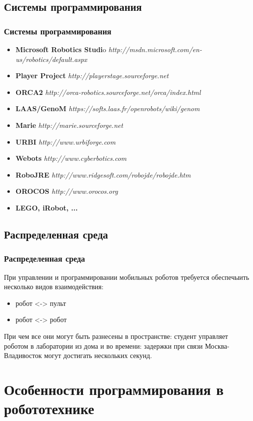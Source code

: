 \documentclass{beamer}
\begin{document}
\subsection{Системы программирования}
\begin{frame}
\frametitle{Системы программирования}
\begin{itemize}
\item<1> \textbf{Microsoft Robotics Studi}o \textit{http://msdn.microsoft.com/en-us/robotics/default.aspx}
\item<1> \textbf{Player Project} \textit{http://playerstage.sourceforge.net}
\item<1> \textbf{ORCA2} \textit{http://orca-robotics.sourceforge.net/orca/index.html}
\item<1> \textbf{LAAS/GenoM} \textit{https://softs.laas.fr/openrobots/wiki/genom}
\item<1> \textbf{Marie} \textit{http://marie.sourceforge.net}
\item<1> \textbf{URBI} \textit{http://www.urbiforge.com}
\item<1> \textbf{Webots} \textit{http://www.cyberbotics.com}
\item<1> \textbf{RoboJRE} \textit{http://www.ridgesoft.com/robojde/robojde.htm}
\item<1> \textbf{OROCOS} \textit{http://www.orocos.org}
\item<1> \textbf{LEGO, iRobot, ...}
\end{itemize}
\end{frame}



\subsection{Распределенная среда}
\begin{frame}
\frametitle{Распределенная среда}
При управлении и программировании мобильных роботов требуется обеспечыить несколько видов взаимодействия:
\begin{itemize}
\item<1> робот <-> пульт
\item<1> робот <-> робот
\end{itemize}
При чем все они могут быть разнесены в пространстве: студент управляет роботом
в лаборатории из дома и во времени: задержки при связи Москва-Владивосток могут
достигать нескольких секунд.
\end{frame}


\section{Особенности программирования в робототехнике}
\end{document}
